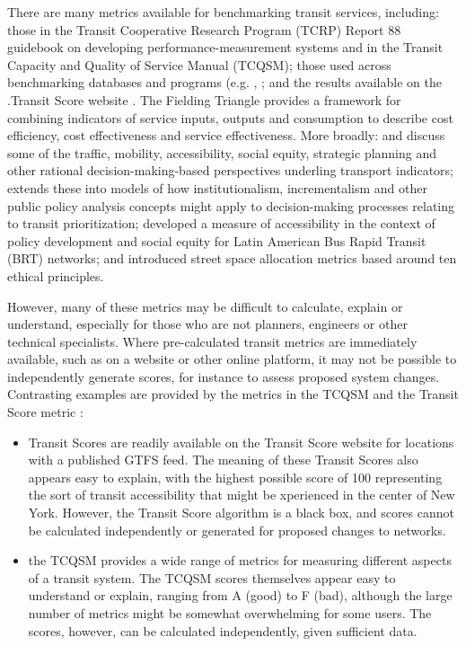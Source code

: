 \documentclass[preprint, 3p,
authoryear]{elsarticle} %
\begin{document}
There are many metrics available for benchmarking transit services,
including: those in the Transit Cooperative Research Program (TCRP)
Report 88 guidebook on developing performance-measurement systems
\citep{Ryus:2003aa} and in the Transit Capacity and Quality of Service
Manual (TCQSM)\citep{TCQSM:2013}; those used across benchmarking
databases and programs (e.g.
\citet{Florida-Transit-Information-System:2018aa}, \citet{UITP:2015aa}
\citet{Imperial-College-London:2023aa}; and the results available on the
.Transit Score website \citep{WalkScore:2023tg}. The Fielding Triangle
\citep{FieldingGordonJ1987Mpts} provides a framework for combining
indicators of service inputs, outputs and consumption to describe cost
efficiency, cost effectiveness and service effectiveness. More broadly:
\citet{Litman:2003ab} and \citet{Litman:2016aa} discuss some of the
traffic, mobility, accessibility, social equity, strategic planning and
other rational decision-making-based perspectives underling transport
indicators; \citet{Reynolds:2017ah} extends these into models of how
institutionalism, incrementalism and other public policy analysis
concepts might apply to decision-making processes relating to transit
prioritization; \citet{GuzmanLuisA.2017Aeit} developed a measure of
accessibility in the context of policy development and social equity for
Latin American Bus Rapid Transit (BRT) networks; and
\citet{Creutzig2020streetspaceallocation} introduced street space
allocation metrics based around ten ethical principles.

However, many of these metrics may be difficult to calculate, explain or
understand, especially for those who are not planners, engineers or
other technical specialists. Where pre-calculated transit metrics are
immediately available, such as on a website or other online platform, it
may not be possible to independently generate scores, for instance to
assess proposed system changes. Contrasting examples are provided by the
metrics in the TCQSM and the Transit Score metric
\citep{WalkScore:2023tg}:

\begin{itemize}
\item
  Transit Scores are readily available on the Transit Score website for
  locations with a published GTFS feed. The meaning of these Transit
  Scores also appears easy to explain, with the highest possible score
  of 100 representing the sort of transit accessibility that might be
  xperienced in the center of New York. However, the Transit Score
  algorithm is a black box, and scores cannot be calculated
  independently or generated for proposed changes to networks.
\item
  the TCQSM provides a wide range of metrics for measuring different
  aspects of a transit system. The TCQSM scores themselves appear easy
  to understand or explain, ranging from A (good) to F (bad), although
  the large number of metrics might be somewhat overwhelming for some
  users. The scores, however, can be calculated independently, given
  sufficient data.
\end{itemize}
\end{document}
